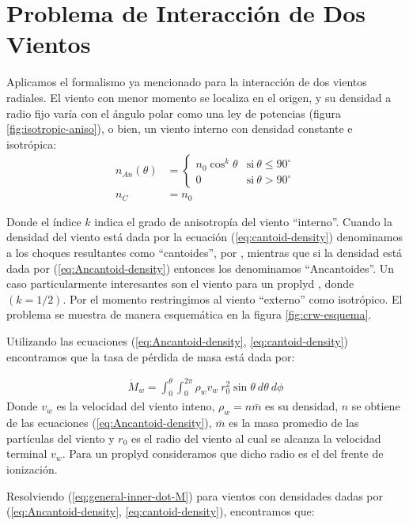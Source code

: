 \section[Interacción de Dos Vientos]{Problema de Interacción de Dos Vientos}
\label{sec:CRW-2-winds}
Aplicamos el formalismo ya mencionado para la interacción de dos vientos radiales. El viento con menor momento se localiza en el origen, y su densidad a radio fijo varía con el ángulo polar como una ley de potencias (figura \ref{fig:isotropic-aniso}), o bien, un viento interno con densidad constante e isotrópica:
\begin{align}
  n_{An}(\theta) &=\left\lbrace
  \begin{array}{lr}
    n_0\cos^k\theta  & \mathrm{si~}\theta\leq 90^\circ \\
    0 & \mathrm{si~}\theta > 90^\circ
  \end{array}\right. \label{eq:Ancantoid-density}\\
  n_C &= n_0 \label{eq:cantoid-density}
\end{align}

Donde el índice $k$ indica el grado de anisotropía del viento ``interno''. Cuando la densidad del viento está dada por la ecuación (\ref{eq:cantoid-density}) denominamos a los choques resultantes como ``cantoides'', por \citet{Canto:1996}, mientras que si la densidad está dada por (\ref{eq:Ancantoid-density}) entonces los denominamos ``Ancantoides''. Un caso particularmente interesantes son el viento para un proplyd \citep{HA:1998}, donde $(k=1/2)$. Por el momento restringimos al viento ``externo'' como isotrópico. El problema se muestra de manera esquemática en la figura \ref{fig:crw-esquema}.

Utilizando las ecuaciones (\ref{eq:Ancantoid-density}, \ref{eq:cantoid-density}) encontramos que la tasa de pérdida de masa está dada por:

\begin{align}
  \dot{M}_w = \int^\theta_0\int^{2\pi}_0\rho_w v_w~r^2_0\sin\theta~d\theta~d\phi  \label{eq:general-inner-dot-M}
\end{align}
Donde $v_w$ es la velocidad del viento inteno, $\rho_w = n\bar{m}$  es su densidad, $n$ se obtiene de las ecuaciones (\ref{eq:Ancantoid-density}), $\bar{m}$  es la masa promedio de las partículas del viento y $r_0$ es el radio del viento al cual se alcanza la velocidad terminal $v_w$. Para un proplyd consideramos que dicho radio es el del frente de ionización.

Resolviendo (\ref{eq:general-inner-dot-M}) para vientos con densidades dadas por (\ref{eq:Ancantoid-density}, \ref{eq:cantoid-density}), encontramos que:

